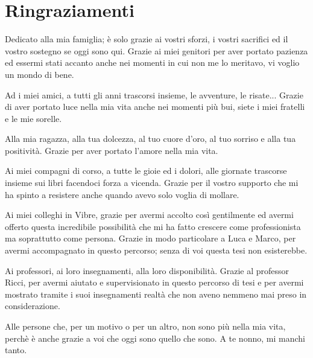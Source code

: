\chapter*{Ringraziamenti}
Dedicato alla mia famiglia; è solo grazie ai vostri sforzi, i vostri sacrifici ed il vostro sostegno se oggi sono qui.\newline
Grazie ai miei genitori per aver portato pazienza ed essermi stati accanto anche nei momenti in cui non me lo meritavo, vi voglio un mondo di bene.\newline

\noindent Ad i miei amici, a tutti gli anni trascorsi insieme, le avventure, le risate...\newline
Grazie di aver portato luce nella mia vita anche nei momenti più bui, siete i miei fratelli e le mie sorelle.\newline

\noindent Alla mia ragazza, alla tua dolcezza, al tuo cuore d'oro, al tuo sorriso e alla tua positività. Grazie per aver portato l'amore nella mia vita.\newline

\noindent Ai miei compagni di corso, a tutte le gioie ed i dolori, alle giornate trascorse insieme sui libri facendoci forza a vicenda.\newline
Grazie per il vostro supporto che mi ha spinto a resistere anche quando avevo solo voglia di mollare.\newline

\noindent Ai miei colleghi in Vibre, grazie per avermi accolto così gentilmente ed avermi offerto questa incredibile possibilità che mi ha fatto crescere come professionista ma soprattutto come persona.\newline
Grazie in modo particolare a Luca e Marco, per avermi accompagnato in questo percorso; senza di voi questa tesi non esisterebbe.\newline

\noindent Ai professori, ai loro insegnamenti, alla loro disponibilità.\newline
Grazie al professor Ricci, per avermi aiutato e supervisionato in questo percorso di tesi e per avermi mostrato tramite i suoi insegnamenti realtà che non aveno nemmeno mai preso in considerazione.\newline

\noindent Alle persone che, per un motivo o per un altro, non sono più nella mia vita, perchè è anche grazie a voi che oggi sono quello che sono.\newline
A te nonno, mi manchi tanto.
